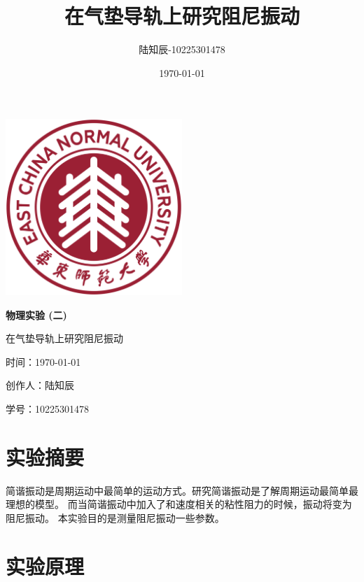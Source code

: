 \documentclass{ctexart}
\title{在气垫导轨上研究阻尼振动}
\author{陆知辰-10225301478}
\date{\today}
\begin{document}
\begin{titlepage}
  \centering
  \includegraphics[width=0.5\textwidth]{ecnu.png}
  
  \vspace*{\baselineskip}
  
  \Huge\textbf{物\quad 理\quad 实\quad 验 \quad (二)}
  \vspace*{0.3\baselineskip}
  
  \huge 在气垫导轨上研究阻尼振动
  
  \vspace*{2\baselineskip}
  
  \large 时间：\today
  
  \vspace*{\baselineskip}
  
  \large 创作人：陆知辰
  
  \vspace*{\baselineskip}
  
  \large 学号：10225301478
  
\end{titlepage}
\newpage
\tableofcontents
\newpage
\section{实验摘要}
简谐振动是周期运动中最简单的运动方式。研究简谐振动是了解周期运动最简单最理想的模型。
而当简谐振动中加入了和速度相关的粘性阻力的时候，振动将变为阻尼振动。
本实验目的是测量阻尼振动一些参数。

\section{实验原理}
\end{document}
